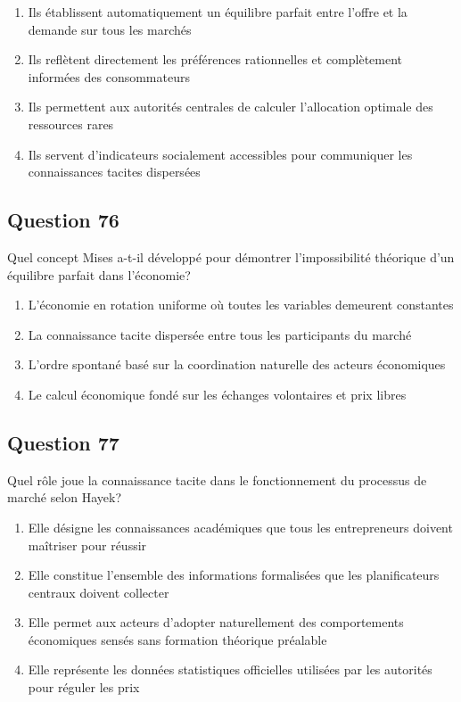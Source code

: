 \documentclass[12pt,a4paper]{article}
\begin{document}
\begin{enumerate}[label=\Alph*., leftmargin=*]
\item Ils établissent automatiquement un équilibre parfait entre l'offre et la demande sur tous les marchés
\item Ils reflètent directement les préférences rationnelles et complètement informées des consommateurs
\item Ils permettent aux autorités centrales de calculer l'allocation optimale des ressources rares
\item Ils servent d'indicateurs socialement accessibles pour communiquer les connaissances tacites dispersées
\end{enumerate}

\bigskip


\subsection*{Question 76}
Quel concept Mises a-t-il développé pour démontrer l'impossibilité théorique d'un équilibre parfait dans l'économie?

\begin{enumerate}[label=\Alph*., leftmargin=*]
\item L'économie en rotation uniforme où toutes les variables demeurent constantes
\item La connaissance tacite dispersée entre tous les participants du marché
\item L'ordre spontané basé sur la coordination naturelle des acteurs économiques
\item Le calcul économique fondé sur les échanges volontaires et prix libres
\end{enumerate}

\bigskip


\subsection*{Question 77}
Quel rôle joue la connaissance tacite dans le fonctionnement du processus de marché selon Hayek?

\begin{enumerate}[label=\Alph*., leftmargin=*]
\item Elle désigne les connaissances académiques que tous les entrepreneurs doivent maîtriser pour réussir
\item Elle constitue l'ensemble des informations formalisées que les planificateurs centraux doivent collecter
\item Elle permet aux acteurs d'adopter naturellement des comportements économiques sensés sans formation théorique préalable
\item Elle représente les données statistiques officielles utilisées par les autorités pour réguler les prix
\end{enumerate}
\end{document}
